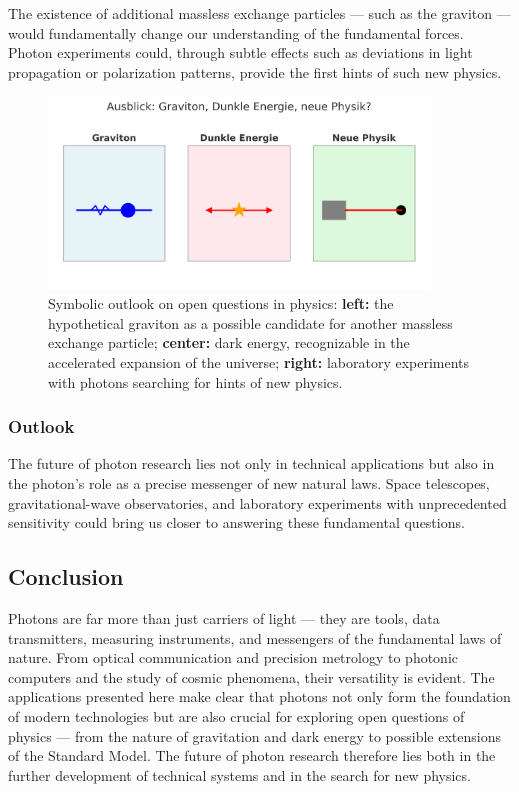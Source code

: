 \begin{tcolorbox}[hypobox, title={What If the Photon Were Not the Only Massless Boson?}, label={box:photon_neue_physik}]
	\small
	The existence of additional massless exchange particles — such as the graviton — would fundamentally change our understanding of the fundamental forces.  
	Photon experiments could, through subtle effects such as deviations in light propagation or polarization patterns, provide the first hints of such new physics.
\end{tcolorbox}
\begin{figure}[H]
	\centering
	\includegraphics[width=0.9\textwidth]{bilder/photonen_ausblick_fixed.png}
	\caption{Symbolic outlook on open questions in physics:
		\textbf{left:} the hypothetical graviton as a possible candidate for another massless exchange particle;
		\textbf{center:} dark energy, recognizable in the accelerated expansion of the universe;
		\textbf{right:} laboratory experiments with photons searching for hints of new physics.}
	\label{fig:photonen_ausblick}
\end{figure}

\subsubsection{Outlook}

The future of photon research lies not only in technical applications but also in the photon’s role as a precise messenger of new natural laws.  
Space telescopes, gravitational-wave observatories, and laboratory experiments with unprecedented sensitivity could bring us closer to answering these fundamental questions.

\subsection{Conclusion}

Photons are far more than just carriers of light — they are tools, data transmitters, measuring instruments, and messengers of the fundamental laws of nature.  
From optical communication and precision metrology to photonic computers and the study of cosmic phenomena, their versatility is evident.  
The applications presented here make clear that photons not only form the foundation of modern technologies but are also crucial for exploring open questions of physics — from the nature of gravitation and dark energy to possible extensions of the Standard Model.  
The future of photon research therefore lies both in the further development of technical systems and in the search for new physics.

